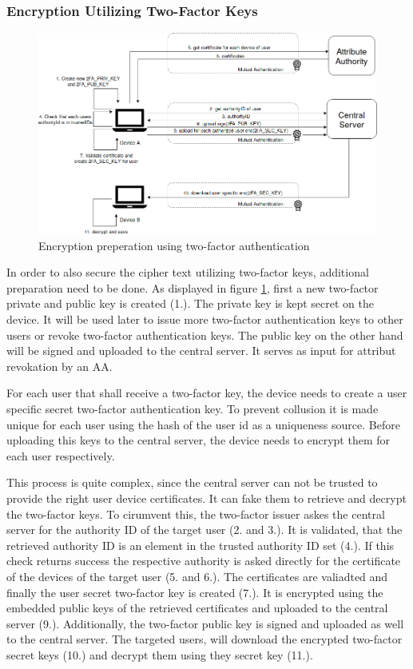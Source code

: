 \subsubsection{Encryption Utilizing Two-Factor Keys}
\label{sec:encryption-utilizing-two-factor-keys}
\begin{figure}[!t]
\centering
    \includegraphics[width=1\linewidth]{img/encryption_2FA.png}
    \caption{Encryption preperation using two-factor authentication}
    \label{fig:tfdacmacs-encrypt-2fa}
\end{figure}

In order to also secure the cipher text utilizing two-factor keys, additional preparation need to be done.  As displayed in figure \ref{fig:tfdacmacs-encrypt-2fa}, first a new two-factor private and public key is created (1.). The private key is kept secret on the device. It will be used later to issue more two-factor authentication keys to other users or revoke two-factor authentication keys. The public key on the other hand will be signed and uploaded to the central server. It serves as input for attribut revokation by an AA. 

For each user that shall receive a two-factor key, the device needs to create a user specific secret two-factor authentication key. To prevent collusion it is made unique for each user using the hash of the user id as a uniqueness source. Before uploading this keys to the central server, the device needs to encrypt them for each user respectively. 

This process is quite complex, since the central server can not be trusted to provide the right user device certificates. It can fake them to retrieve and decrypt the two-factor keys. To cirumvent this, the two-factor issuer askes the central server for the authority ID of the target user (2. and 3.). It is validated, that the retrieved authority ID is an element in the trusted authority ID set (4.). If this check returns success the respective authority is asked directly for the certificate of the devices of the target user (5. and 6.). The certificates are valiadted and finally the user secret two-factor key is created (7.). It is  encrypted using the embedded public keys of the retrieved certificates and uploaded to the central server (9.). Additionally, the two-factor public key is signed and uploaded as well to the central server. The targeted users, will download the encrypted two-factor secret keys (10.) and decrypt them using they secret key (11.).  

